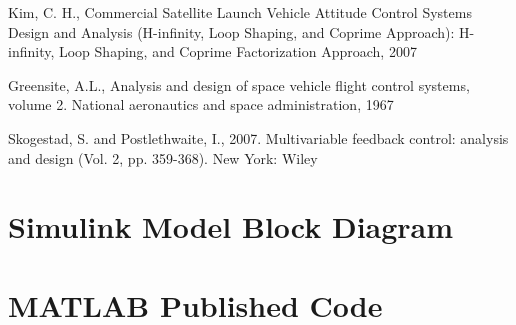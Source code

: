 \documentclass[12pt]{article}
\begin{document}
\begin{thebibliography}{9}
	 Kim, C. H., Commercial Satellite Launch Vehicle Attitude Control Systems Design and Analysis (H-infinity, Loop Shaping, and Coprime Approach): H-infinity, Loop Shaping, and Coprime Factorization Approach, 2007
	
	 Greensite, A.L., Analysis and design of space vehicle flight control systems, volume 2. National aeronautics and space administration, 1967
	
	 Skogestad, S. and Postlethwaite, I., 2007. Multivariable feedback control: analysis and design (Vol. 2, pp. 359-368). New York: Wiley
\end{thebibliography}
	
	\appendix
	\section{Simulink Model Block Diagram}
	\section{MATLAB Published Code}
	\label{appendix}
	
	
\end{document}
